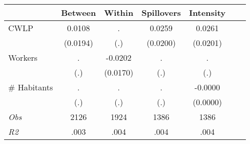 \begin{tabular}{l*{6}{c}}\hline&\multicolumn{1}{c}{Between}&\multicolumn{1}{c}{Within}&\multicolumn{1}{c}{Spillovers}&\multicolumn{1}{c}{Intensity}\\ \hline 
CWLP & 0.0108 & . & 0.0259 & 0.0261 \\
 & (0.0194) & (.) & (0.0200) & (0.0201) \\
Workers & . & -0.0202 & . & . \\
 & (.) & (0.0170) & (.) & (.) \\
\# Habitants & . & . & . & -0.0000 \\
  & (.) & (.) & (.) & (0.0000) \\
\hline \textit{Obs} & 2126 & 1924 & 1386 & 1386  \\ \textit{R2} & .003 & .004 & .004 & .004 \\ \hline \end{tabular}
